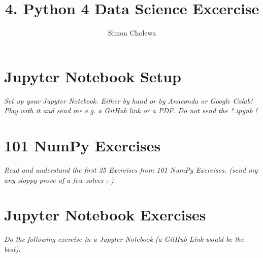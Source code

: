 \documentclass[11pt,a4paper]{article}
\author{Simon Cholewa}
\title{4. Python 4 Data Science Excercise}
\begin{document}
\maketitle

\section{Jupyter Notebook Setup}
\textit{Set up your Jupyter Notebook. Either by hand or by Anaconda or Google Colab! Play with it and send me e.g. a GitHub link or a PDF.
Do not send the *.ipynb !}
   
\section{101 NumPy Exercises}
\textit{Read and understand the first 25 Exercises from 101 NumPy Exercises. (send my any sloppy prove of a few solves ;-)}



\section{Jupyter Notebook Exercises}
\textit{Do the following exercise in a Jupyter Notebook (a GitHub Link would be the best):}
\end{document}
